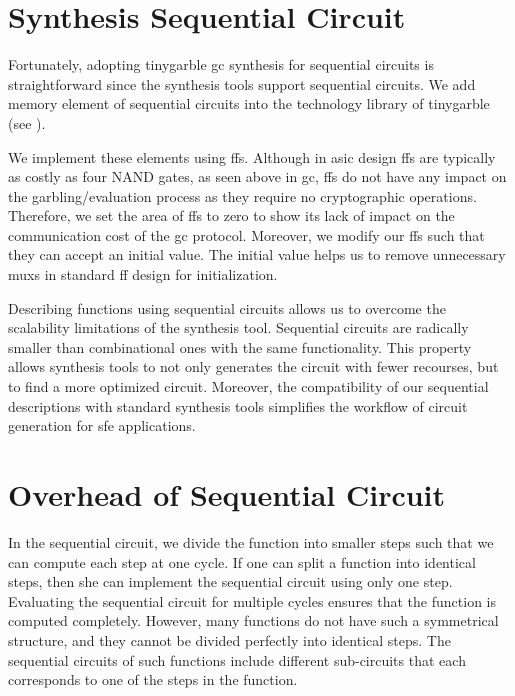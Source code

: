 \section{Synthesis Sequential Circuit}\label{sec:seq-syn}
Fortunately, adopting \gls{tinygarble} \acrshort{gc} synthesis for sequential circuits is straightforward since the synthesis tools support sequential circuits.
We add memory element of sequential circuits into the technology library of \gls{tinygarble} (see ).

We implement these elements using \acrshort{ff}s.
Although in \acrshort{asic} design \acrshort{ff}s are typically as costly as four NAND gates, as seen above in \acrshort{gc}, \acrshort{ff}s do not have any impact on the garbling/evaluation process as they require no cryptographic operations.
Therefore, we set the area of \acrshort{ff}s to zero to show its lack of impact on the communication cost of the \acrshort{gc} protocol.
Moreover, we modify our \acrshort{ff}s such that they can accept an initial value.
The initial value helps us to remove unnecessary \acrshort{mux}s in standard \acrshort{ff} design for initialization.

Describing functions using sequential circuits allows us to overcome the scalability limitations of the synthesis tool.
Sequential circuits are radically smaller than combinational ones with the same functionality.
This property allows synthesis tools to not only generates the circuit with fewer recourses, but to find a more optimized circuit.
Moreover, the compatibility of our sequential descriptions with standard synthesis tools simplifies the workflow of circuit generation for \acrshort{sfe} applications.

\section{Overhead of Sequential Circuit}\label{sec:seq-overhead}
In the sequential circuit, we divide the function into smaller steps such that we can compute each step at one cycle.
If one can split a function into identical steps, then she can implement the sequential circuit using only one step.
Evaluating the sequential circuit for multiple cycles ensures that the function is computed completely.
However, many functions do not have such a symmetrical structure, and they cannot be divided perfectly into identical steps.
The sequential circuits of such functions include different sub-circuits that each corresponds to one of the steps in the function.

